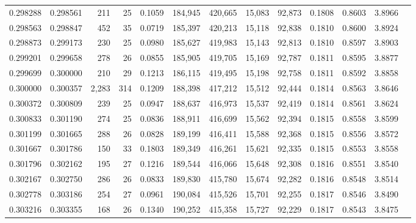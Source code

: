 \begin{tabular}{rrrrrrrrrrrrr}
0.298288 & 0.298561 &    211 &    25 &                                     0.1059 & 184,945 & 420,665 &  15,083 &  92,873 & 0.1808 & 0.8603 & 3.8966 \\
0.298563 & 0.298847 &    452 &    35 &                                     0.0719 & 185,397 & 420,213 &  15,118 &  92,838 & 0.1810 & 0.8600 & 3.8924 \\
0.298873 & 0.299173 &    230 &    25 &                                     0.0980 & 185,627 & 419,983 &  15,143 &  92,813 & 0.1810 & 0.8597 & 3.8903 \\
0.299201 & 0.299658 &    278 &    26 &                                     0.0855 & 185,905 & 419,705 &  15,169 &  92,787 & 0.1811 & 0.8595 & 3.8877 \\
0.299699 & 0.300000 &    210 &    29 &                                     0.1213 & 186,115 & 419,495 &  15,198 &  92,758 & 0.1811 & 0.8592 & 3.8858 \\
0.300000 & 0.300357 &  2,283 &   314 &                                     0.1209 & 188,398 & 417,212 &  15,512 &  92,444 & 0.1814 & 0.8563 & 3.8646 \\
0.300372 & 0.300809 &    239 &    25 &                                     0.0947 & 188,637 & 416,973 &  15,537 &  92,419 & 0.1814 & 0.8561 & 3.8624 \\
0.300833 & 0.301190 &    274 &    25 &                                     0.0836 & 188,911 & 416,699 &  15,562 &  92,394 & 0.1815 & 0.8558 & 3.8599 \\
0.301199 & 0.301665 &    288 &    26 &                                     0.0828 & 189,199 & 416,411 &  15,588 &  92,368 & 0.1815 & 0.8556 & 3.8572 \\
0.301667 & 0.301786 &    150 &    33 &                                     0.1803 & 189,349 & 416,261 &  15,621 &  92,335 & 0.1815 & 0.8553 & 3.8558 \\
0.301796 & 0.302162 &    195 &    27 &                                     0.1216 & 189,544 & 416,066 &  15,648 &  92,308 & 0.1816 & 0.8551 & 3.8540 \\
0.302167 & 0.302750 &    286 &    26 &                                     0.0833 & 189,830 & 415,780 &  15,674 &  92,282 & 0.1816 & 0.8548 & 3.8514 \\
0.302778 & 0.303186 &    254 &    27 &                                     0.0961 & 190,084 & 415,526 &  15,701 &  92,255 & 0.1817 & 0.8546 & 3.8490 \\
0.303216 & 0.303355 &    168 &    26 &                                     0.1340 & 190,252 & 415,358 &  15,727 &  92,229 & 0.1817 & 0.8543 & 3.8475 \\

\end{tabular}
